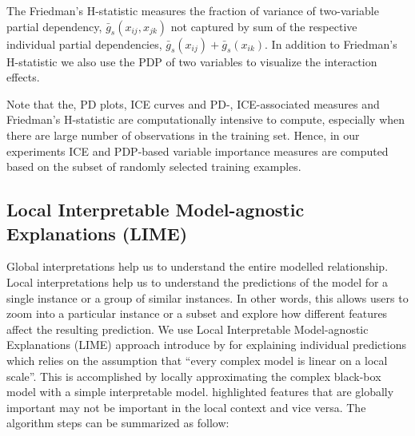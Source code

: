 \documentclass[11pt,a4paper,]{article}
\begin{document}
The Friedman's H-statistic measures the fraction of variance of
two-variable partial dependency, \(\bar{g}_{s}(x_{ij}, x_{jk})\) not
captured by sum of the respective individual partial dependencies,
\(\bar{g}_{s}(x_{ij})+\bar{g}_{s}(x_{ik})\). In addition to Friedman's
H-statistic we also use the PDP of two variables to visualize the
interaction effects.

Note that the, PD plots, ICE curves and PD-, ICE-associated measures and
Friedman's H-statistic are computationally intensive to compute,
especially when there are large number of observations in the training
set. Hence, in our experiments ICE and PDP-based variable importance
measures are computed based on the subset of randomly selected training
examples.

\subsection{Local Interpretable Model-agnostic Explanations
(LIME)}\label{local-interpretable-model-agnostic-explanations-lime}

Global interpretations help us to understand the entire modelled
relationship. Local interpretations help us to understand the
predictions of the model for a single instance or a group of similar
instances. In other words, this allows users to zoom into a particular
instance or a subset and explore how different features affect the
resulting prediction. We use Local Interpretable Model-agnostic
Explanations (LIME) approach introduce by \textcite{ribeiro2016should}
for explaining individual predictions which relies on the assumption
that ``every complex model is linear on a local scale''. This is
accomplished by locally approximating the complex black-box model with a
simple interpretable model. \textcite{ribeiro2016should} highlighted
features that are globally important may not be important in the local
context and vice versa. The algorithm steps can be summarized as follow:
\end{document}
